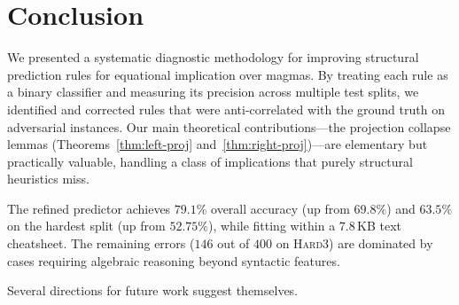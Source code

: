 \section{Conclusion}\label{sec:conclusion}

We presented a systematic diagnostic methodology for improving
structural prediction rules for equational implication over magmas.
By treating each rule as a binary classifier and measuring its
precision across multiple test splits, we identified and corrected
rules that were anti-correlated with the ground truth on adversarial
instances.  Our main theoretical contributions---the projection
collapse lemmas (Theorems~\ref{thm:left-proj}
and~\ref{thm:right-proj})---are elementary but practically valuable,
handling a class of implications that purely structural heuristics
miss.

The refined predictor achieves $79.1\%$ overall accuracy (up from
$69.8\%$) and $63.5\%$ on the hardest split (up from $52.75\%$),
while fitting within a $7.8$\,KB text cheatsheet.  The remaining
errors ($146$ out of $400$ on \textsc{Hard3}) are dominated by
cases requiring algebraic reasoning beyond syntactic features.

Several directions for future work suggest themselves.

